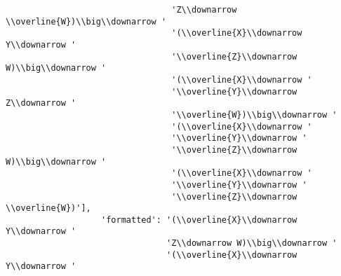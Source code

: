 \begin{verbatim}
                                 'Z\\downarrow \\overline{W})\\big\\downarrow '
                                 '(\\overline{X}\\downarrow Y\\downarrow '
                                 '\\overline{Z}\\downarrow W)\\big\\downarrow '
                                 '(\\overline{X}\\downarrow '
                                 '\\overline{Y}\\downarrow Z\\downarrow '
                                 '\\overline{W})\\big\\downarrow '
                                 '(\\overline{X}\\downarrow '
                                 '\\overline{Y}\\downarrow '
                                 '\\overline{Z}\\downarrow W)\\big\\downarrow '
                                 '(\\overline{X}\\downarrow '
                                 '\\overline{Y}\\downarrow '
                                 '\\overline{Z}\\downarrow \\overline{W})'],
                   'formatted': '(\\overline{X}\\downarrow Y\\downarrow '
                                'Z\\downarrow W)\\big\\downarrow '
                                '(\\overline{X}\\downarrow Y\\downarrow '

\end{verbatim}
